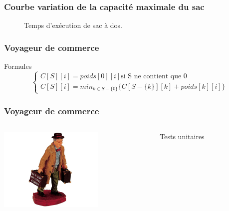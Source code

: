 \documentclass[french]{beamer}
\begin{document}
  \begin{frame}
    \frametitle{Courbe variation de la capacité maximale du sac}
\begin{figure}[h!]
\centering
{}
\caption{Temps d'exécution de sac à dos.}
\end{figure}
  \end{frame}

  \begin{frame}
    \frametitle{Voyageur de commerce}
    \begin{alertblock}{Formules}
      \begin{equation}
        \begin{cases}
          C[S][i] = poids[0][i] \text{si S ne contient que $0$} \\
          C[S][i] = min_{k \in S - \{ 0 \}} \{ C[S- \{ k \}][k] + poids[k][i]  \}
        \end{cases}
      \end{equation}
    \end{alertblock}
  \end{frame}

\begin{frame}
  \frametitle{Voyageur de commerce}
  \begin{columns}
    \begin{column}[]{5cm}
      \begin{center}
        \includegraphics[height=4cm]{salesman2.jpg}
      \end{center}
    \end{column}
      \begin{column}[]{5cm}
        \begin{block}{Tests unitaires}
        \end{block}
      \end{column}
    \end{columns}
  \end{frame}
\end{document}
